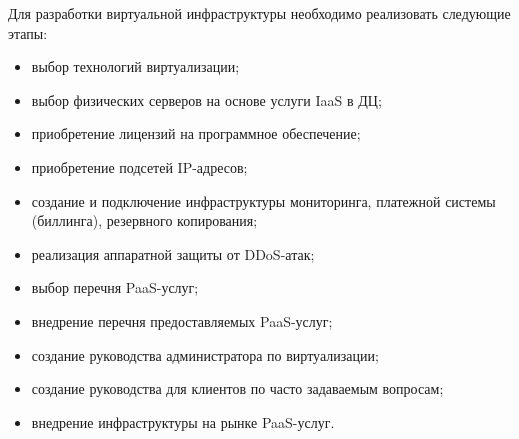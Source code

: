 Для разработки виртуальной инфраструктуры необходимо реализовать следующие этапы:
\begin{itemize}
    \item выбор технологий виртуализации;
    \item выбор физических серверов на основе услуги IaaS в ДЦ;
    \item приобретение лицензий на программное обеспечение;
    \item приобретение подсетей IP-адресов;
    \item создание и подключение инфраструктуры мониторинга, платежной системы (биллинга), резервного копирования;
    \item реализация аппаратной защиты от DDoS-атак;
    \item выбор перечня PaaS-услуг;
    \item внедрение перечня предоставляемых PaaS-услуг;
    \item создание руководства администратора по виртуализации;
    \item создание руководства для клиентов по часто задаваемым вопросам;
    \item внедрение инфраструктуры на рынке PaaS-услуг.
\end{itemize}

\clearpage
